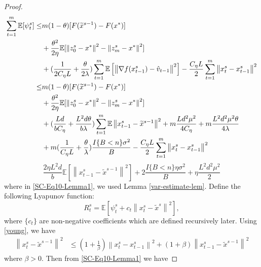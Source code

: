\documentclass{article}
\newcommand*{\E}{\mathbb{E}}
\newcommand{\norm}[1]{\left\lVert#1\right\rVert}
\theoremstyle{definition}
\theoremstyle{remark}
\begin{document}
{\begin{proof}
\begin{align}
\sum_{t=1}^{m}\E[\psi_{t}^s] \leq &m(1-\theta)[F(\widetilde{x}^{s-1})-F(x^*)]\notag\\
&+ {\frac{ \theta^2}{2\eta}}\E[\norm{z_{0}^s-x^*}^2-\norm{z_{m}^s-x^*}^2]\notag\\
&+(\frac{1}{2C_{\eta} L}+\frac{\theta}{2\lambda})\sum_{t=1}^{m}\E\left[\norm{\nabla f(x_{t-1}^s)-\hat{v}_{t-1}}^2\right]-\frac{C_{\eta} L}{2}\sum_{t=1}^{m}\norm{x_{t}^s-x_{t-1}^s}^2\notag\\
\leq &m(1-\theta)[F(\widetilde{x}^{s-1})-F(x^*)] \notag\\
&+ {\frac{ \theta^2}{2\eta}}\E[\norm{z_{0}^s-x^*}^2-\norm{z_{m}^s-x^*}^2]\notag\\
&+(\frac{Ld}{bC_{\eta}}+\frac{L^2d\theta}{b\lambda})\sum_{t=1}^{m} \E\norm{x_{t-1}^s-\widetilde{x}^{s-1}}^2+m\frac{Ld^2\mu^2}{4C_{\eta}}+m\frac{ L^2d^2\mu^2\theta}{4\lambda}\notag\\
&+ m(\frac{1}{C_{\eta} L}+\frac{\theta}{\lambda})\frac{I\{B < n\} \sigma ^2}{B}-\frac{C_{\eta} L}{2}\sum_{t=1}^{m}\norm{x_{t}^s-x_{t-1}^s}^2\label{SC-Eq10-Lemma1}
\end{align}
{\color{red}
\begin{equation}
\frac{2\eta L^2 d}{b}\E\left[\norm{x_{t-1}^s-\widetilde{x}^{s-1}}^2\right]+ 2\frac{I\{B < n\}\eta \sigma ^2}{B}+\eta \frac{L^2 d^2 \mu^2}{2}
\end{equation}}
where in \eqref{SC-Eq10-Lemma1}, we used Lemma \ref{var-estimate-lem}. Define the following Lyapunov function:
\begin{equation}
R_t^s = \E\left[\psi_{t}^s+ c_t\norm{x_t^s-\tilde{x}^s}^2\right],
\end{equation}
where $\{c_t\}$ are non-negative coefficients which are defined recursively later. Using \eqref{young}, we have
\begin{align}
\norm{x_{t}^s-\widetilde{x}^{s-1}}^2 &\leq (1+\frac{1}{\beta})\norm{x_{t}^s-x_{t-1}^s}^2+(1+\beta)\norm{x_{t-1}^s-\widetilde{x}^{s-1}}^2
\end{align}
where $\beta > 0$. Then from \eqref{SC-Eq10-Lemma1} we have 


\end{proof}}
\end{document}

